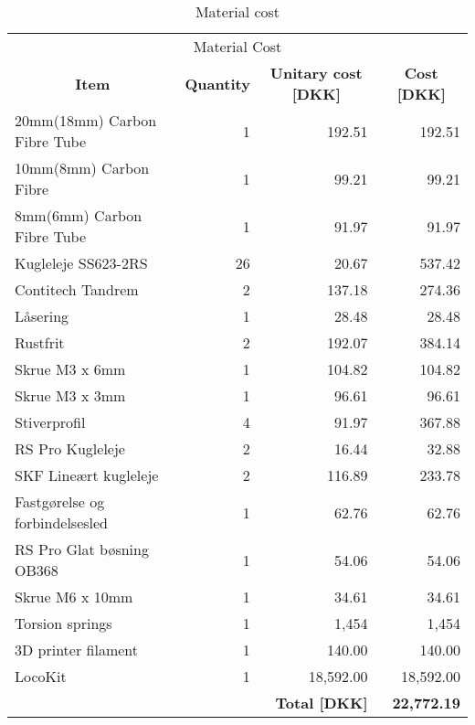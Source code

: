 \begin{table}[htbp]
\caption{Material cost}
\centering
\begin{tabular}{l|r|r|r}
\multicolumn{4}{c}{\Large Material Cost} \\
\multicolumn{1}{c|}{\textbf{Item}} & \multicolumn{1}{c|}{\textbf{Quantity}} & \multicolumn{1}{c|}{\textbf{Unitary cost [DKK]}} & \multicolumn{1}{c}{\textbf{Cost [DKK]}} \\ \hline
20mm(18mm) Carbon Fibre Tube & 1 & 192.51 & 192.51 \\ \hline
10mm(8mm) Carbon Fibre & 1 & 99.21 & 99.21 \\ \hline
8mm(6mm) Carbon Fibre Tube & 1 & 91.97 & 91.97 \\ \hline
Kugleleje SS623-2RS & 26 & 20.67 & 537.42 \\ \hline
Contitech Tandrem & 2 & 137.18 & 274.36 \\ \hline
Låsering & 1 & 28.48 & 28.48 \\ \hline
Rustfrit & 2 & 192.07 & 384.14 \\ \hline
Skrue M3 x 6mm & 1 & 104.82 & 104.82 \\ \hline
Skrue M3 x 3mm & 1 & 96.61 & 96.61 \\ \hline
Stiverprofil & 4 & 91.97 & 367.88 \\ \hline
RS Pro Kugleleje & 2 & 16.44 & 32.88 \\ \hline
SKF Lineært kugleleje & 2 & 116.89 & 233.78 \\ \hline
Fastgørelse og forbindelsesled & 1 & 62.76 & 62.76 \\ \hline
RS Pro Glat bøsning OB368 & 1 & 54.06 & 54.06 \\ \hline
Skrue M6 x 10mm & 1 & 34.61 & 34.61 \\ \hline
Torsion springs & 1 & 1,454 & 1,454 \\ \hline
3D printer filament & 1 & 140.00 & 140.00 \\ \hline
LocoKit  & 1 & 18,592.00 & 18,592.00 \\ \hline
\multicolumn{2}{l}{} & \textbf{Total [DKK]} & \textbf{22,772.19} \\
\end{tabular}
\label{tab:material_cost}
\end{table}

